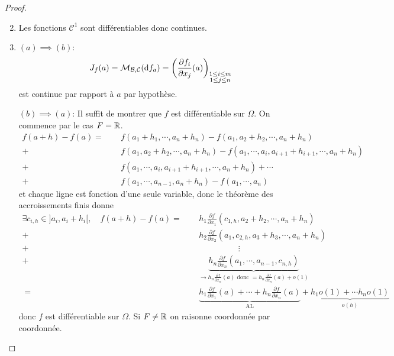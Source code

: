 \begin{proof}~
    \begin{enumerate}
        \setcounter{enumi}{1}
    \item Les fonctions $\mathcal C^1$ sont différentiables donc continues.
    \item $(a) \implies (b)$: \[
            J_f(a)=\mathcal M_{\mathcal B, \mathcal C}(\mathrm{d} f_a)= \left( \frac{\partial f_i}{\partial x_j} (a) \right)_{\substack{1\leq i\leq m\\1\leq j\leq n}}
        \]
        est continue par rapport à $a$ par hypothèse.

        $(b) \implies (a)$: Il suffit de montrer que $f$ est différentiable sur $\Omega$. On commence par le cas $F=\mathbb R$. \begin{align*}
            f(a+h)-f(a) = \phantom{+} & f(a_1+h_1, \cdots, a_n+h_n)-f(a_1, a_2+h_2, \cdots, a_n+h_n) \\
            + & f(a_1, a_2+h_2, \cdots, a_n+h_n)-f(a_1, \cdots, a_i, a_{i+1}+h_{i+1}, \cdots, a_n+h_n) \\
            + & f(a_1, \cdots, a_i, a_{i+1}+h_{i+1}, \cdots, a_n+h_n) + \cdots \\
            + & f(a_1, \cdots, a_{n-1}, a_n+h_n)-f(a_1, \cdots, a_n)
        \end{align*}
        et chaque ligne est fonction d'une seule variable, donc le théorème des accroissements finis donne
        \begin{align*}
            \exists c_{i,h}\in]a_i,a_i+h_i[, \quad f(a+h)-f(a)=\phantom+ &
            h_1\frac{\partial f}{\partial x_1}(c_{1,h}, a_2+h_2, \cdots, a_n+h_n)\\
            + & h_2 \frac{\partial f}{\partial x_2}(a_1, c_{2,h},a_3+h_3,\cdots, a_n+h_n)\\
            + & \hspace{2cm}\vdots \\
            + & \underbrace{h_n \frac{\partial f}{\partial x_n} (a_1, \cdots, a_{n-1}, c_{n,h})}_{\longrightarrow h_n \frac{\partial f}{\partial x_n}(a) \text{ donc } =h_n \frac{\partial f}{\partial x_n}(a)+o(1) } \\
            =\phantom + & \underbrace{h_1 \frac{\partial f}{\partial x_1}(a)+\cdots + h_n \frac{\partial f}{\partial x_n} (a) }_{\text{AL}}  + \underbrace{h_1o(1)+\cdots h_no(1)}_{o(h)}
        \end{align*}
        donc $f$ est différentiable sur $\Omega$. Si $F\neq \mathbb R$ on raisonne coordonnée par coordonnée.
\end{enumerate}
\end{proof}

